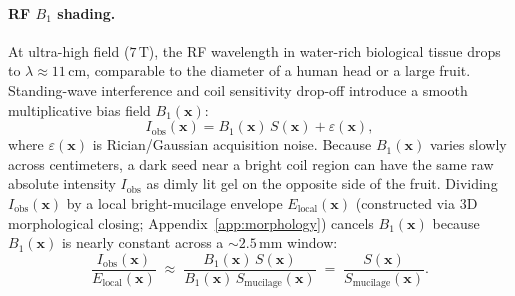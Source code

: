 \documentclass[10pt,a4paper]{article}
\renewcommand{\_}{\origunderscore\allowbreak}
\begin{document}
\paragraph{RF $B_1$ shading.} At ultra-high field ($7\,\text{T}$), the RF wavelength in water-rich biological tissue drops to $\lambda \approx 11\,\text{cm}$, comparable to the diameter of a human head or a large fruit. Standing-wave interference and coil sensitivity drop-off introduce a smooth multiplicative bias field $B_1(\mathbf{x})$:
\begin{equation}
    I_{\text{obs}}(\mathbf{x}) = B_1(\mathbf{x})\,S(\mathbf{x}) + \varepsilon(\mathbf{x}),
    \label{eq:b1_shading}
\end{equation}
where $\varepsilon(\mathbf{x})$ is Rician/Gaussian acquisition noise. Because $B_1(\mathbf{x})$ varies slowly across centimeters, a dark seed near a bright coil region can have the same raw absolute intensity $I_{\text{obs}}$ as dimly lit gel on the opposite side of the fruit. Dividing $I_{\text{obs}}(\mathbf{x})$ by a local bright-mucilage envelope $E_{\text{local}}(\mathbf{x})$ (constructed via 3D morphological closing; Appendix~\ref{app:morphology}) cancels $B_1(\mathbf{x})$ because $B_1(\mathbf{x})$ is nearly constant across a $\sim 2.5\,\text{mm}$ window:
\begin{equation}
    \frac{I_{\text{obs}}(\mathbf{x})}{E_{\text{local}}(\mathbf{x})} \;\approx\; \frac{B_1(\mathbf{x})\,S(\mathbf{x})}{B_1(\mathbf{x})\,S_{\text{mucilage}}(\mathbf{x})} \;=\; \frac{S(\mathbf{x})}{S_{\text{mucilage}}(\mathbf{x})}.
    \label{eq:b1_cancel}
\end{equation}
\end{document}

